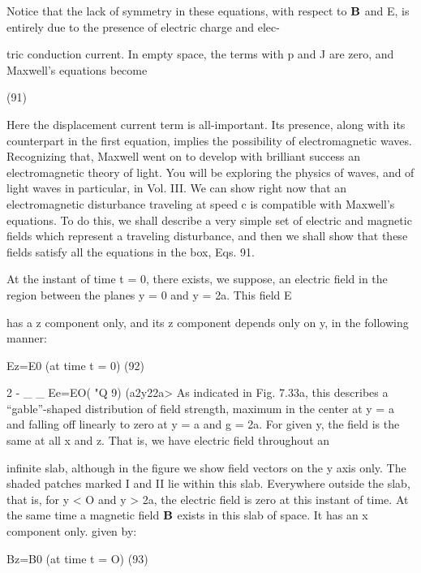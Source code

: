 Notice that the lack of symmetry in these equations, with respect
to $\mathbf{B}$ and E, is entirely due to the presence of electric charge and elec-

tric conduction current. In empty space, the terms with p and J are
zero, and Maxwell's equations become

\begin{equation}
\end{equation}
(91)

 

Here the displacement current term is all-important. Its presence,
along with its counterpart in the first equation, implies the possibility
of electromagnetic waves. Recognizing that, Maxwell went on to
develop with brilliant success an electromagnetic theory of light.
You will be exploring the physics of waves, and of light waves in
particular, in Vol. III. We can show right now that an electromagnetic
disturbance traveling at speed c is compatible with Maxwell's
equations. To do this, we shall describe a very simple set of electric
and magnetic fields which represent a traveling disturbance, and
then we shall show that these fields satisfy all the equations in the
box, Eqs. 91.

At the instant of time t = 0, there exists, we suppose, an electric
field in the region between the planes y = 0 and y = 2a. This field E

has a z component only, and its z component depends only on y, in
the following manner:

\begin{equation}
\end{equation}
Ez=E0%
(at time t = 0) (92)

2 - _ _
Ee=EO( "Q 9) (a2y22a>
As indicated in Fig. 7.33a, this describes a ``gable''-shaped distribution
of field strength, maximum in the center at y = a and falling off
linearly to zero at y = a and g = 2a. For given y, the field is the
same at all x and z. That is, we have electric field throughout an

infinite slab, although in the figure we show field vectors on the y axis
only. The shaded patches marked I and II lie within this slab.
Everywhere outside the slab, that is, for y < O and y > 2a, the electric
field is zero at this instant of time. At the same time a magnetic
field $\mathbf{B}$ exists in this slab of space. It has an x component only.
given by:

\begin{equation}
\end{equation}
Bz=B0%
(at time t = O) (93)

